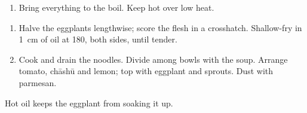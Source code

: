


\begin{ingredients}
\end{ingredients}

\begin{recipe}
  \begin{enumerate}

  \item Bring everything to the boil. Keep hot over low heat.

  \end{enumerate}
\end{recipe}



\begin{ingredients}
\end{ingredients}

\begin{recipe}
  \begin{enumerate}

  \item Halve the eggplants lengthwise; score the flesh in a
    crosshatch. Shallow-fry in 1~cm of oil at 180\degreeC, both
    sides, until tender.

  \item Cook and drain the noodles. Divide among bowls with the
    soup. Arrange tomato, chāshū and lemon; top with eggplant and
    sprouts. Dust with parmesan.

  \end{enumerate}
\end{recipe}

\notes Hot oil keeps the eggplant from soaking it up.


